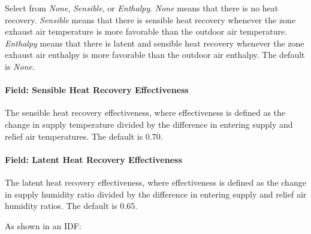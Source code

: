 Select from \emph{None}, \emph{Sensible}, or \emph{Enthalpy}. \emph{None} means that there is no heat recovery. \emph{Sensible} means that there is sensible heat recovery whenever the zone exhaust air temperature is more favorable than the outdoor air temperature. \emph{Enthalpy} means that there is latent and sensible heat recovery whenever the zone exhaust air enthalpy is more favorable than the outdoor air enthalpy. The default is \emph{None}.

\paragraph{Field: Sensible Heat Recovery Effectiveness}\label{field-sensible-heat-recovery-effectiveness}

The sensible heat recovery effectiveness, where effectiveness is defined as the change in supply temperature divided by the difference in entering supply and relief air temperatures. The default is 0.70.

\paragraph{Field: Latent Heat Recovery Effectiveness}\label{field-latent-heat-recovery-effectiveness}

The latent heat recovery effectiveness, where effectiveness is defined as the change in supply humidity ratio divided by the difference in entering supply and relief air humidity ratios. The default is 0.65.

As shown in an IDF:

